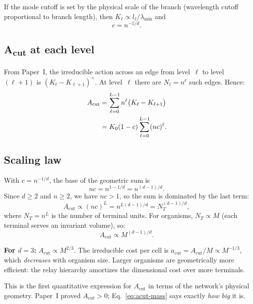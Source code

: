 \documentclass[aps,pre,twocolumn,superscriptaddress,longbibliography]{revtex4-2}
\newcommand{\Acut}{A_{\text{cut}}}
\begin{document}
If the mode cutoff is set by the physical scale of the
branch (wavelength cutoff proportional to branch length),
then $K_\ell \propto l_\ell / \lambda_{\min}$ and
\begin{equation}
  c = n^{-1/d}.
  \label{eq:c-from-d}
\end{equation}


\subsection{A\textsubscript{cut} at each level}

From Paper~I, the irreducible action across an edge
from level~$\ell$ to level~$(\ell+1)$ is
$(K_\ell - K_{\ell+1})^+$.
At level~$\ell$ there are $N_\ell = n^\ell$ such edges.
Hence:
\begin{align}
  \Acut &= \sum_{\ell=0}^{L-1} n^\ell
    \bigl(K_\ell - K_{\ell+1}\bigr) \notag\\
  &= K_0(1 - c) \sum_{\ell=0}^{L-1} (nc)^\ell.
  \label{eq:acut-sum}
\end{align}


\subsection{Scaling law}

With $c = n^{-1/d}$, the base of the geometric sum is
\begin{equation}
  nc = n^{1 - 1/d} = n^{(d-1)/d}.
  \label{eq:nc}
\end{equation}
Since $d \ge 2$ and $n \ge 2$, we have $nc > 1$, so the
sum is dominated by the last term:
\begin{equation}
  \Acut \propto (nc)^L = n^{L(d-1)/d} = N_T^{(d-1)/d},
  \label{eq:acut-scaling}
\end{equation}
where $N_T = n^L$ is the number of terminal units.
For organisms, $N_T \propto M$ (each terminal serves an
invariant volume), so:
\begin{equation}
  \boxed{\Acut \propto M^{(d-1)/d}.}
  \label{eq:acut-mass}
\end{equation}

\textbf{For $d = 3$:}
$\Acut \propto M^{2/3}$.
The irreducible cost per cell is
$a_{\text{cut}} = \Acut / M \propto M^{-1/3}$,
which \emph{decreases} with organism size.
Larger organisms are geometrically more efficient:
the relay hierarchy amortizes the dimensional cost
over more terminals.

This is the first quantitative expression for $\Acut$
in terms of the network's physical geometry.
Paper~I proved $\Acut > 0$; Eq.~\eqref{eq:acut-mass}
says exactly \emph{how big} it is.
\end{document}
